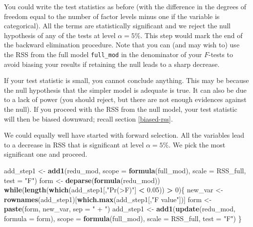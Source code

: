 \documentclass[]{book}
\newenvironment{Shaded}{\begin{snugshade}}{\end{snugshade}}
\newcommand{\ControlFlowTok}[1]{\textcolor[rgb]{0.13,0.29,0.53}{\textbf{#1}}}
\newcommand{\DataTypeTok}[1]{\textcolor[rgb]{0.13,0.29,0.53}{#1}}
\newcommand{\DecValTok}[1]{\textcolor[rgb]{0.00,0.00,0.81}{#1}}
\newcommand{\FloatTok}[1]{\textcolor[rgb]{0.00,0.00,0.81}{#1}}
\newcommand{\KeywordTok}[1]{\textcolor[rgb]{0.13,0.29,0.53}{\textbf{#1}}}
\newcommand{\NormalTok}[1]{#1}
\newcommand{\OperatorTok}[1]{\textcolor[rgb]{0.81,0.36,0.00}{\textbf{#1}}}
\newcommand{\StringTok}[1]{\textcolor[rgb]{0.31,0.60,0.02}{#1}}
\theoremstyle{definition}
\theoremstyle{definition}
\theoremstyle{definition}
\theoremstyle{remark}
\begin{document}
You could write the test statistics as before (with the difference in
the degrees of freedom equal to the number of factor levels minus one if
the variable is categorical). All the terms are statistically
significant and we reject the null hypothesis of any of the tests at
level \(\alpha = 5\%\). This step would mark the end of the backward
elimination procedure. Note that you can (and may wish to) use the RSS
from the full model \texttt{full\_mod} in the denominator of your
\(F\)-tests to avoid biasing your results if retaining the null leads to
a sharp decrease.

If your test statistic is small, you cannot conclude anything. This may
be because the null hypothesis that the simpler model is adequate is
true. It can also be due to a lack of power (you should reject, but
there are not enough evidences against the null). If you proceed with
the RSS from the null model, your test statistic will then be biased
downward; recall section \ref{biased-rss}.

We could equally well have started with forward selection. All the
variables lead to a decrease in RSS that is significant at level
\(\alpha = 5\%\). We pick the most significant one and proceed.

\begin{Shaded}
\begin{Highlighting}[]
\NormalTok{add_step1 <-}\StringTok{ }\KeywordTok{add1}\NormalTok{(redu_mod, }\DataTypeTok{scope =} \KeywordTok{formula}\NormalTok{(full_mod), }\DataTypeTok{scale =}\NormalTok{ RSS_full, }\DataTypeTok{test =} \StringTok{"F"}\NormalTok{)}
\NormalTok{form <-}\StringTok{ }\KeywordTok{deparse}\NormalTok{(}\KeywordTok{formula}\NormalTok{(redu_mod))}
\ControlFlowTok{while}\NormalTok{(}\KeywordTok{length}\NormalTok{(}\KeywordTok{which}\NormalTok{(add_step1[,}\StringTok{"Pr(>F)"}\NormalTok{] }\OperatorTok{<}\StringTok{ }\FloatTok{0.05}\NormalTok{)) }\OperatorTok{>}\StringTok{ }\DecValTok{0}\NormalTok{)\{}
\NormalTok{  new_var <-}\StringTok{ }\KeywordTok{rownames}\NormalTok{(add_step1)[}\KeywordTok{which.max}\NormalTok{(add_step1[,}\StringTok{"F value"}\NormalTok{])]}
\NormalTok{  form <-}\StringTok{ }\KeywordTok{paste}\NormalTok{(form, new_var, }\DataTypeTok{sep =} \StringTok{" + "}\NormalTok{)}
\NormalTok{  add_step1 <-}\StringTok{ }\KeywordTok{add1}\NormalTok{(}\KeywordTok{update}\NormalTok{(redu_mod, }\DataTypeTok{formula =}\NormalTok{ form), }
                    \DataTypeTok{scope =} \KeywordTok{formula}\NormalTok{(full_mod), }\DataTypeTok{scale =}\NormalTok{ RSS_full, }\DataTypeTok{test =} \StringTok{"F"}\NormalTok{)}
\NormalTok{\}}
\end{Highlighting}
\end{Shaded}
\end{document}
